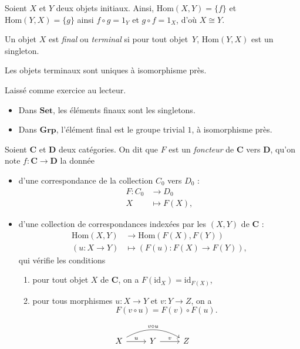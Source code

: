 \begin{prv}
  Soient $X$ et $Y$ deux objets initiaux.
  Ainsi, $\mathrm{Hom}(X,Y) = \{f\}$ et $\mathrm{Hom}(Y,X) = \{g\}$ ainsi $f \circ g = 1_Y$ et $g \circ f = 1_X$, d'où  $X \cong Y$.
\end{prv}

\begin{defn}
  Un objet $X$ est \textit{final} ou \textit{terminal} si pour tout objet~$Y$, $\mathrm{Hom}(Y,X)$ est un singleton.
\end{defn}

\begin{prop}
  Les objets terminaux sont uniques à isomorphisme près.
\end{prop}

\begin{prv}
  Laissé comme exercice au lecteur.
\end{prv}

\begin{exm}
  \begin{itemize}
    \item Dans $\mathbf{Set}$, les éléments finaux sont les singletons.
    \item Dans $\mathbf{Grp}$, l'élément final est le groupe trivial ${1}$, à isomorphisme près.
  \end{itemize}
\end{exm}

\begin{defn}
  Soient $\mathbf{C}$ et $\mathbf{D}$ deux catégories.
  On dit que $F$ est un \textit{foncteur} de $\mathbf{C}$ vers $\mathbf{D}$, qu'on note $f : \mathbf{C} \to \mathbf{D}$ la donnée 
  \begin{itemize}
    \item d'une correspondance de la collection $C_0$ vers $D_0$ :
      \begin{align*}
        F: C_0 &\longrightarrow D_0 \\
        X &\longmapsto F(X)
      ,\end{align*}

    \item d'une collection de correspondances indexées par les $(X,Y)$ de $\mathbf{C}$ :
      \begin{align*}
        \mathrm{Hom}(X,Y) &\longrightarrow \mathrm{Hom}(F(X),F(Y)) \\
        (u : X \to Y) &\longmapsto (F(u) : F(X) \to F(Y))
      ,\end{align*}
      qui vérifie les conditions 
      \begin{enumerate}
        \item pour tout objet $X$ de $\mathbf{C}$,  on a $F(\mathrm{id}_X) = \mathrm{id}_{F(X)}$,
        \item pour tous morphismes $u : X \to Y$ et $v : Y \to Z$, on a 
          \[
            F(v\circ u) = F(v) \circ F(u)
          .\] 
      \end{enumerate}
  \end{itemize}
  \[
  \begin{tikzcd}
    X \arrow{r}{u} \arrow[bend left]{rr}{v \circ u} & Y \arrow{r}{v} & Z
  \end{tikzcd}
  \]
\end{defn}

